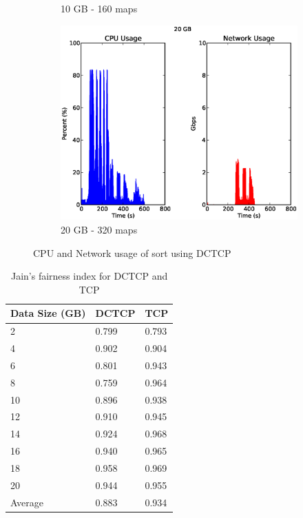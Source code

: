 \documentclass[a4paper,12pt,twoside,openright]{report}
\begin{document}
\begin{figure}[h!]
\begin{subfigure}[b]{0.33\textwidth}
                \caption{10 GB - 160 maps}
                \label{fig:10GBsortresdctcp}
        \end{subfigure}
        \begin{subfigure}[b]{0.33\textwidth}
                \centering
                \includegraphics[width=\textwidth]{320maps_dctcp.csv.eps}
                \caption{20 GB - 320 maps}
                \label{fig:20GBsortresdctcp}
        \end{subfigure}
        \caption{CPU and Network usage of sort using DCTCP}
        \label{chap:eval:sec:ciel:fig:sortresdctcp}
\end{figure}

\begin{table}
                \centering
  \begin{tabular}{| l || l | l |}
    \hline
	Data Size (GB) & DCTCP & TCP \\ \hline
    2 & 0.799 & 0.793 \\ \hline
    4 & 0.902 & 0.904 \\ \hline
    6 & 0.801 & 0.943 \\ \hline
    8 & 0.759 & 0.964 \\ \hline
    10 & 0.896 & 0.938 \\ \hline
    12 & 0.910 & 0.945 \\ \hline
    14 & 0.924 & 0.968 \\ \hline
    16 & 0.940 & 0.965 \\ \hline
    18 & 0.958 & 0.969 \\ \hline
    20 & 0.944 & 0.955 \\ \hline \hline
    Average & 0.883 & 0.934 \\
    \hline
  \end{tabular}
  \caption{Jain's fairness index for DCTCP and TCP}
  \label{chap:eval:sec:ciel:tab:jain}
\end{table}
\end{document}
